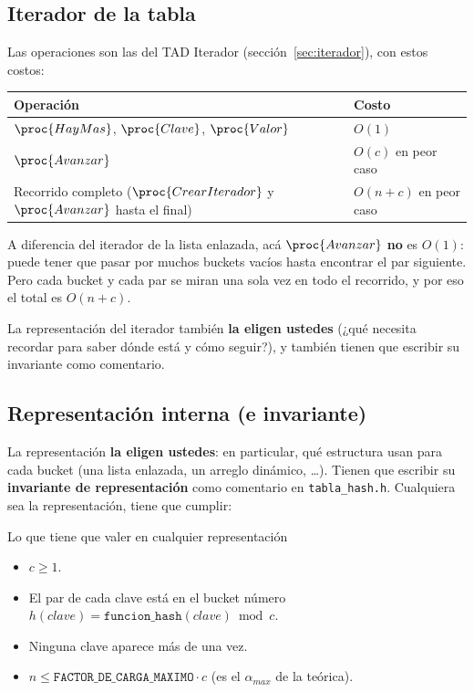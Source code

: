 \documentclass{article}
\begin{document}
\subsection{Iterador de la tabla}

Las operaciones son las del TAD Iterador (sección~\ref{sec:iterador}),
con estos costos:

\begin{center}
\begin{tabular}{@{}ll@{}}
\toprule
Operación & Costo \\
\midrule
$\proc{HayMas}$, $\proc{Clave}$, $\proc{Valor}$ & $O(1)$ \\
$\proc{Avanzar}$ & $O(c)$ en peor caso \\
Recorrido completo ($\proc{CrearIterador}$ y $\proc{Avanzar}$ hasta el final) & $O(n + c)$ en peor caso \\
\bottomrule
\end{tabular}
\end{center}

A diferencia del iterador de la lista enlazada, acá $\proc{Avanzar}$
\textbf{no} es $O(1)$: puede tener que pasar por muchos buckets vacíos
hasta encontrar el par siguiente. Pero cada bucket y cada par se miran
una sola vez en todo el recorrido, y por eso el total es $O(n + c)$.

La representación del iterador también \textbf{la eligen ustedes} (¿qué
necesita recordar para saber dónde está y cómo seguir?), y también
tienen que escribir su invariante como comentario.

\subsection{Representación interna (e invariante)}

La representación \textbf{la eligen ustedes}: en particular, qué
estructura usan para cada bucket (una lista enlazada, un arreglo
dinámico, \ldots). Tienen que escribir su \textbf{invariante de
representación} como comentario en \texttt{tabla\_hash.h}. Cualquiera sea
la representación, tiene que cumplir:

\begin{invariante}{Lo que tiene que valer en cualquier representación}
\begin{itemize}
\item $c \geq 1$.
\item El par de cada clave está en el bucket número
  $h(clave) = \texttt{funcion\_hash}(clave) \bmod c$.
\item Ninguna clave aparece más de una vez.
\item $n \leq \texttt{FACTOR\_DE\_CARGA\_MAXIMO} \cdot c$ (es el $\alpha_{max}$ de la teórica).
\end{itemize}
\end{invariante}
\end{document}
